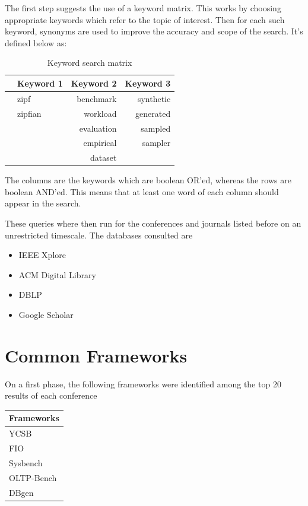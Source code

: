 The first step suggests the use of a keyword matrix. This works by choosing appropriate keywords
which refer to the topic of interest. Then for each such keyword, synonyms are used to improve the accuracy and scope of the search. It's defined below as:

\begin{table}[h!]
    \centering
    \begin{tabular}{|c|l|r|r|}
      \hline
       & \multicolumn{1}{c|}{Keyword 1} & \multicolumn{1}{c|}{Keyword 2} & \multicolumn{1}{c|}{Keyword 3} \\ \hline
       \parbox[t]{3mm}{}
       & zipf   &   benchmark     &    synthetic      \\
       & zipfian   &   workload     &    generated      \\
       &    &   evaluation     &    sampled      \\
       &    &   empirical     &    sampler      \\
       &   &   dataset     &         \\ \hline
    \end{tabular}
    \caption{Keyword search matrix}
    \label{tab:keyword_search_matrix}
  \end{table} 

The columns are the keywords which are boolean OR'ed, whereas the rows are boolean AND'ed.
This means that at least one word of each column should appear in the search.

These queries where then run for the conferences and journals listed before on an unrestricted timescale. The databases consulted are
\begin{itemize}
    \item IEEE Xplore
    \item ACM Digital Library
    \item DBLP
    \item Google Scholar
\end{itemize}


\section{Common Frameworks}

On a first phase, the following frameworks were identified among the top 20 results of each conference
\begin{center}
    \begin{tabular}{|l|}
        \hline
        \textbf{Frameworks} \\ \hline\hline
        \ac{YCSB} \\ \hline
        \ac{FIO} \\ \hline
        Sysbench \\ \hline
        OLTP-Bench \cite{difallahOLTPBenchExtensibleTestbed2013} \\ \hline
        DBgen \\ \hline
    \end{tabular}
\end{center}

